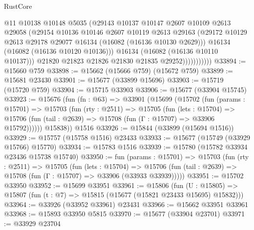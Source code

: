 \begin{lexlean}{RustCore}
\begin{coremodule}
                          @11
                          @10138
                          @10148
                          @5035
                          (@29143
                            @10137
                            @10147
                            @2607
                            @10109
                            @2613
                            @29058
                            (@29154
                              @10136
                              @10146
                              @2607
                              @10119
                              @2613
                              @29163
                              (@29172
                                @10129
                                @2613
                                @29178
                                @29077
                                @16134
                                (@16082 (@16136 @10130 @2629)))
                              @16134
                              (@16082 (@16136 @10120 @10136)))
                            @16134
                            (@16082 (@16136 @10110 @10137)))
                          @21820
                          @21823
                          @21826
                          @21830
                          @21835
                          @29252)))))))))))
@33894 := @15660 @759
@33898 := @15662 (@15666 @759) (@15672 @759)
@33899 := @15681 @23430
@33901 := @15677 (@33899 @15696)
@33903 := @15719 (@15720 @759)
@33904 := @15715 @33903
@33906 := @15677 (@33904 @15745)
@33923 := @15676
    (fun (fn : @63) =>
    @33901
      (@15699
        (@15702
          (fun (params : @15701) =>
          @15703
            (fun (rty : @2511) =>
            @15705
              (fun (lets : @15704) =>
              @15706 (fun (tail : @2639) => @15708 (fun (Γ : @15707) => @33906 @15792))))))
        @15838))
    @1516
@33926 := @15844 (@33899 (@15694 @1516))
@33929 := @15757 (@15758 @1516) @23433
@33933 := @15677 (@15749 (@33929 @15766) @15770)
@33934 := @15783 @1516
@33939 := @15780 (@15782 @33934 @23436 @15738 @15740)
@33950 := fun (params : @15701) =>
  @15703
    (fun (rty : @2511) =>
    @15705
      (fun (lets : @15704) =>
      @15706 (fun (tail : @2639) => @15708 (fun (Γ : @15707) => @33906 (@33933 @33939)))))
@33951 := @15702 @33950
@33952 := @15699 @33951
@33961 := @15806
    (fun (U : @15805) => @15807 (fun (t : @7) => @15815 (@15677 (@15821 @23433 @15695) @15832)))
@33964 := @33926 (@33952 @33961) @23431
@33966 := @15662 @33951 @33961
@33968 := @15893 @33950 @5815
@33970 := @15677 (@33904 @23701)
@33971 := @33929 @23704

\end{coremodule}
\end{lexlean}
